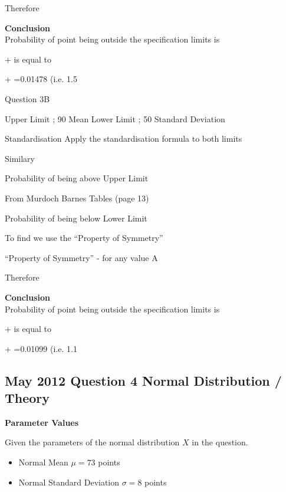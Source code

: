 \documentclass[]{report}
\begin{document}
Therefore 

\noindent \textbf{Conclusion}\\
Probability of point being outside the specification limits is

+ is equal to


+ =0.01478  	(i.e. 1.5%















Question 3B

Upper Limit ; 90		Mean		 	
Lower Limit ; 50		Standard Deviation	 

Standardisation
Apply the standardisation formula	 	to both limits


Similary



Probability of being above Upper Limit

From Murdoch Barnes Tables (page 13)  

Probability of being below Lower Limit


To find   we use the “Property of Symmetry”

“Property of Symmetry” -   for any value A

Therefore 

\noindent \textbf{Conclusion}\\
Probability of point being outside the specification limits is

+ is equal to

+ =0.01099  	(i.e. 1.1%












\subsection{May 2012 Question 4 Normal Distribution / Theory}



\noindent \textbf{Parameter Values}

Given the parameters of the normal distribution $X$ in the question.
\begin{itemize}
	\item Normal Mean $\mu = 73$ points
	\item Normal Standard Deviation $\sigma = 8$ points
\end{itemize}
\end{document}
